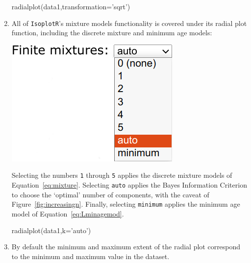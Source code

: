 \begin{refsection}
\begin{enumerate}
\begin{console}
radialplot(data1,transformation='sqrt')
\end{console}

\item All of \texttt{IsoplotR}'s mixture models functionality is
  covered under its radial plot function, including the discrete
  mixture and minimum age models:

\noindent\begin{minipage}[t]{.3\linewidth}
\strut\vspace*{-\baselineskip}\newline
\includegraphics[width=\linewidth]{../figures/MixtureModelsAuto.png}
\end{minipage}
\begin{minipage}[t]{.7\linewidth}
  Selecting the numbers \texttt{1} through \texttt{5} applies the
  discrete mixture models of Equation~\ref{eq:mixture}. Selecting
  \texttt{auto} applies the Bayes Information Criterion to choose the
  `optimal' number of components, with the caveat of
  Figure~\ref{fig:increasingn}. Finally, selecting \texttt{minimum}
  applies the minimum age model of Equation~\ref{eq:Lminagemod}.
\end{minipage}

\begin{console}
radialplot(data1,k='auto')
\end{console}

\item By default the minimum and maximum extent of the radial plot
  correspond to the minimum and maximum value in the dataset.


\end{enumerate}
\end{refsection}
